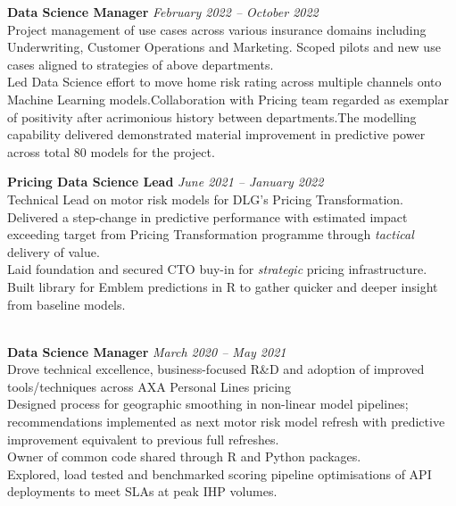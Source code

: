 \documentclass[11pt]{article}
\begin{document}
\begin{description}
\textbf{Data Science Manager} \emph{February 2022 -- October 2022} \\
\textbullet \quad Project management of use cases across various insurance domains including Underwriting, Customer Operations and Marketing. Scoped pilots and new use cases aligned to strategies of above departments. \\
\textbullet \quad Led Data Science effort to move home risk rating across multiple channels onto Machine Learning models.\quad Collaboration with Pricing team regarded as exemplar of positivity after acrimonious history between departments.\quad The modelling capability delivered demonstrated material improvement in predictive power across total 80 models for the project.\\

\item[Direct Line Group:] \hspace{1mm} \textbf{Pricing Data Science Lead} \emph{June 2021 -- January 2022} \\
\textbullet \quad Technical Lead on motor risk models for DLG's Pricing Transformation.\\
\textbullet \quad Delivered a step-change in predictive performance with 
estimated impact exceeding target from Pricing Transformation programme through \emph{tactical} delivery of value.\\
\textbullet \quad Laid foundation and secured CTO buy-in for \emph{strategic} pricing infrastructure.\\
\textbullet \quad Built library for Emblem predictions in R to gather quicker and deeper insight from baseline models.\\

\item[AXA Insurance - Retail:] \hspace{1mm} \\
\textbf{Data Science Manager} \emph{March 2020 -- May 2021}\\
\textbullet \quad Drove technical excellence, business-focused R\&D and adoption of improved tools/techniques across AXA Personal Lines pricing \\
\textbullet \quad Designed process for geographic smoothing in non-linear model pipelines; recommendations implemented as next motor risk model refresh with predictive improvement equivalent to previous full refreshes.\\
\textbullet \quad Owner of common code shared through R and Python packages.\\
\textbullet \quad Explored, load tested and benchmarked scoring pipeline optimisations of API deployments to meet SLAs at peak IHP volumes.\\


\end{description}
\end{document}
